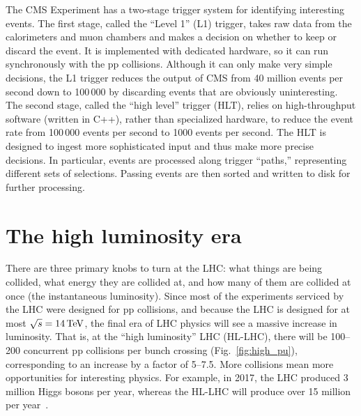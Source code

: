 The CMS Experiment has a two-stage trigger system for identifying interesting events. 
The first stage, called the ``Level 1'' (L1) trigger, takes raw data from the calorimeters and muon chambers and makes a decision on whether to keep or discard the event. 
It is implemented with dedicated hardware, so it can run synchronously with the pp collisions. 
Although it can only make very simple decisions, the L1 trigger reduces the output of CMS from 40 million events per second down to 100\,000 by discarding events that are obviously uninteresting. 
The second stage, called the ``high level'' trigger (HLT), relies on high-throughput software (written in C++), rather than specialized hardware, to reduce the event rate from 100\,000 events per second to 1000 events per second. 
The HLT is designed to ingest more sophisticated input and thus make more precise decisions. 
In particular, events are processed along trigger ``paths,'' representing different sets of selections. 
Passing events are then sorted and written to disk for further processing. 

\section{The high luminosity era}
There are three primary knobs to turn at the LHC: what things are being collided, what energy they are collided at, and how many of them are collided at once (the instantaneous luminosity). 
Since most of the experiments serviced by the LHC were designed for pp collisions, and because the LHC is designed for at most $\sqrt{s} = 14\,\text{Te\hspace{-.08em}V}$, the final era of LHC physics will see a massive increase in luminosity. 
That is, at the ``high luminosity'' LHC (HL-LHC), there will be 100--200 concurrent pp collisions per bunch crossing (Fig.~\ref{fig:high_pu}), corresponding to an increase by a factor of 5--7.5.
More collisions mean more opportunities for interesting physics. 
For example, in 2017, the LHC produced 3 million Higgs bosons per year, whereas the HL-LHC will produce over 15 million per year~\cite{HighLumiWebFacts}. 

